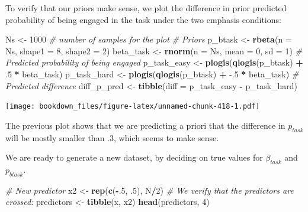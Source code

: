 \documentclass[12pt,]{krantz}
\newenvironment{Shaded}{\begin{snugshade}}{\end{snugshade}}
\newcommand{\KeywordTok}[1]{\textcolor[rgb]{0.13,0.29,0.53}{\textbf{#1}}}
\newcommand{\DataTypeTok}[1]{\textcolor[rgb]{0.13,0.29,0.53}{#1}}
\newcommand{\DecValTok}[1]{\textcolor[rgb]{0.00,0.00,0.81}{#1}}
\newcommand{\FloatTok}[1]{\textcolor[rgb]{0.00,0.00,0.81}{#1}}
\newcommand{\StringTok}[1]{\textcolor[rgb]{0.31,0.60,0.02}{#1}}
\newcommand{\CommentTok}[1]{\textcolor[rgb]{0.56,0.35,0.01}{\textit{#1}}}
\newcommand{\OperatorTok}[1]{\textcolor[rgb]{0.81,0.36,0.00}{\textbf{#1}}}
\newcommand{\NormalTok}[1]{#1}
\theoremstyle{definition}
\theoremstyle{definition}
\theoremstyle{definition}
\theoremstyle{remark}
\begin{document}
To verify that our priors make sense, we plot the difference in prior
predicted probability of being engaged in the task under the two
emphasis conditions:

\begin{Shaded}
\begin{Highlighting}[]
\NormalTok{Ns <-}\StringTok{ }\DecValTok{1000} \CommentTok{# number of samples for the plot}
\CommentTok{# Priors}
\NormalTok{p_btask <-}\StringTok{ }\KeywordTok{rbeta}\NormalTok{(}\DataTypeTok{n =}\NormalTok{ Ns, }\DataTypeTok{shape1 =} \DecValTok{8}\NormalTok{, }\DataTypeTok{shape2 =} \DecValTok{2}\NormalTok{)}
\NormalTok{beta_task <-}\StringTok{ }\KeywordTok{rnorm}\NormalTok{(}\DataTypeTok{n =}\NormalTok{ Ns, }\DataTypeTok{mean =} \DecValTok{0}\NormalTok{, }\DataTypeTok{sd =} \DecValTok{1}\NormalTok{)}
\CommentTok{# Predicted probability of being engaged}
\NormalTok{p_task_easy <-}\StringTok{ }\KeywordTok{plogis}\NormalTok{(}\KeywordTok{qlogis}\NormalTok{(p_btask) }\OperatorTok{+}\StringTok{ }\FloatTok{.5} \OperatorTok{*}\StringTok{ }\NormalTok{beta_task)}
\NormalTok{p_task_hard <-}\StringTok{ }\KeywordTok{plogis}\NormalTok{(}\KeywordTok{qlogis}\NormalTok{(p_btask) }\OperatorTok{+}\StringTok{ }\FloatTok{-.5} \OperatorTok{*}\StringTok{ }\NormalTok{beta_task)}
\CommentTok{# Predicted difference}
\NormalTok{diff_p_pred <-}\StringTok{ }\KeywordTok{tibble}\NormalTok{(}\DataTypeTok{diff =}\NormalTok{ p_task_easy }\OperatorTok{-}\StringTok{ }\NormalTok{p_task_hard)}
\end{Highlighting}
\end{Shaded}

\begin{Shaded}
\end{Shaded}

\texttt{[image: bookdown\_files/figure-latex/unnamed-chunk-418-1.pdf]}

The previous plot shows that we are predicting a priori that the
difference in \(p_{task}\) will be mostly smaller than \(.3\), which
seems to make sense.

We are ready to generate a new dataset, by deciding on true values for
\(\beta_{task}\) and \(p_{btask}\).

\begin{Shaded}
\begin{Highlighting}[]
\CommentTok{# New predictor}
\NormalTok{x2 <-}\StringTok{ }\KeywordTok{rep}\NormalTok{(}\KeywordTok{c}\NormalTok{(}\OperatorTok{-}\NormalTok{.}\DecValTok{5}\NormalTok{, }\FloatTok{.5}\NormalTok{), N}\OperatorTok{/}\DecValTok{2}\NormalTok{)}
\CommentTok{# We verify that the predictors are crossed:}
\NormalTok{predictors <-}\StringTok{ }\KeywordTok{tibble}\NormalTok{(x, x2)}
\KeywordTok{head}\NormalTok{(predictors, }\DecValTok{4}\NormalTok{)}
\end{Highlighting}
\end{Shaded}
\end{document}
